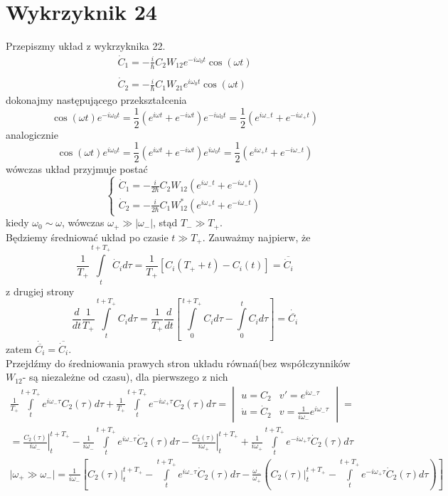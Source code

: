 \documentclass[a4paper,12pt]{article}
\begin{document}
\section{Wykrzyknik 24}
	Przepiszmy układ z wykrzyknika 22.
	$$
	\begin{array}{l}
		\dot{C}_1 = -\frac{i}{\hbar}C_2 W_{12}e^{-i\omega_0 t}\cos(\omega t)\\\\
		\dot{C}_2 =  -\frac{i}{\hbar}C_1 W_{21}e^{i\omega_0t}\cos(\omega t)
	\end{array}
	$$
	dokonajmy następującego przekształcenia
	$$
	\cos(\omega t) e^{-i\omega_0t} = \frac{1}{2}\left( e^{i\omega t}+e^{-i\omega t} \right)e^{-i\omega_0t} = \frac{1}{2}\left(e^{i\omega_{-}t}+e^{-i\omega_{+}t}\right)
	$$
	analogicznie
	$$
	\cos(\omega t) e^{i\omega_0t} = \frac{1}{2}\left( e^{i\omega t}+e^{-i\omega t} \right)e^{i\omega_0t} = \frac{1}{2}\left(e^{i\omega_{+}t}+e^{-i\omega_{-}t}\right)
	$$
	wówczas układ przyjmuje postać
	$$
	\left\{\begin{gathered}
		\dot{C}_1 = -\frac{i}{2\hbar}C_2 W_{12} \left(e^{i\omega_{-}t}+e^{-i\omega_{+}t}\right)\\
		\dot{C}_2 =  -\frac{i}{2\hbar}C_1 W_{12}^* \left(e^{i\omega_{+}t}+e^{-i\omega_{-}t}\right)
	\end{gathered} \right.
	$$
	kiedy $\omega_0 \sim \omega$, wówczas $\omega_{+}\gg|\omega_{-}|$, stąd $T_- \gg T_+$.\\
	Będziemy średniować układ po czasie $t\gg T_+$. Zauważmy najpierw, że
	$$
	\frac{1}{T_+}\int\limits_t^{t+T_+}\dot{C}_id\tau = \frac{1}{T_+}\left[C_i(T_++t)-C_i(t)\right] = \overline{\dot{C}_i}
	$$
	z drugiej strony
	$$
	\frac{d}{dt}\frac{1}{T_+}\int\limits_t^{t+T_+}C_id\tau = \frac{1}{T_+}\frac{d}{dt}\left[\int\limits_0^{t+T_+}C_id\tau-\int\limits_0^t C_id\tau\right] = \dot{\overline{C_i}}
	$$
	zatem $\dot{\overline{C_i}} = \overline{\dot{C}_i}$.\\
	Przejdźmy do średniowania prawych stron układu równań(bez współczynników $W_{12}$- są niezależne od czasu), dla pierwszego z nich
	$$
	\begin{gathered}
		\frac{1}{T_+}\int\limits_t^{t+T_+}e^{i\omega_{-}\tau}C_2(\tau)d\tau + \frac{1}{T_+}\int\limits_t^{t+T_+}e^{-i\omega_{+}\tau}C_2(\tau)d\tau =
		\begin{vmatrix}
			u = C_2 & v'=e^{i\omega_{-}\tau}\\ \dot{u}=\dot{C}_2 & v = \frac{1}{i\omega_-}e^{i\omega_-\tau}
		\end{vmatrix} = \\
		= \left.\frac{C_2(\tau)}{i\omega_-}\right|_t^{t+T_+} - \frac{1}{i\omega_-}\int\limits_t^{t+T_+}e^{i\omega_-\tau}\dot{C}_2(\tau)d\tau - \left.\frac{C_2(\tau)}{i\omega_+}\right|_t^{t+T_+} + \frac{1}{i\omega_+}\int\limits_t^{t+T_+}e^{-i\omega_+\tau}\dot{C}_2(\tau)d\tau \\
		\bigg\vert \omega_+ \gg \omega_- \bigg\vert = \frac{1}{i\omega_-}\left[\left.C_2(\tau)\right|_t^{t+T_+} -\int\limits_t^{t+T_+}e^{i\omega_-\tau}\dot{C}_2(\tau)d\tau
		-\frac{\omega_-}{\omega_+}\left(\left.C_2(\tau)\right|_t^{t+T_+}-\int\limits_t^{t+T_+}e^{-i\omega_+\tau}\dot{C}_2(\tau)d\tau\right)\right]
	\end{gathered}
	$$
\end{document}
